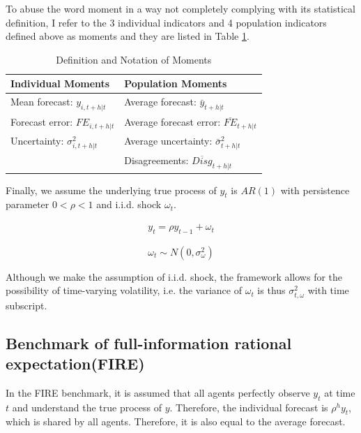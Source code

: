 \documentclass[12pt]{article}
\begin{document}
	To abuse the word moment in a way not completely complying with its statistical definition, I refer to the 3 individual indicators and 4 population indicators defined above as moments and they are  listed in Table \ref{MomSum}.
	
	\begin{table}[p]
		\centering
		\caption{Definition and Notation of Moments}
		\label{MomSum}
		\begin{tabular}{ll}
			
			\hline 
			Individual Moments                                  & Population Moments                             \\
			\hline 
			Mean forecast: $y_{i,t+h|t}$                   & Average forecast: $\bar y_{t+h|t}$                   \\
			Forecast error: $FE_{i,t+h|t}$ & Average forecast error: $\overline{FE}_{t+h|t}$ \\
			Uncertainty: $\sigma^2_{i,t+h|t}$         & Average uncertainty:  $\bar \sigma^2_{t+h|t}$ \\
			& Disagreements:  $\overline{Disg}_{t+h|t}$       \\
			\hline 
		\end{tabular}
	\end{table}
	
	Finally, we assume the underlying true process of $y_{t}$ is $AR(1)$ with persistence parameter $0<\rho <1$ and i.i.d. shock $\omega_t$. 
	
	\begin{eqnarray}\label{AR_process}
		y_{t} = \rho y_{t-1} + \omega_t
	\end{eqnarray}
	
	$$\omega_t \sim N(0,\sigma^2_{\omega})$$
	
	Although we make the assumption of i.i.d. shock, the framework allows for the possibility of time-varying volatility, i.e. the variance of $\omega_t$ is thus $\sigma^2_{t,\omega}$ with time subscript. 
	
	\subsection{Benchmark of full-information rational expectation(FIRE)}
	
	In the FIRE benchmark,  it is assumed that all agents perfectly observe $y_t$ at time $t$ and understand the true process of $y$. Therefore, the individual forecast is $\rho^h y_t $, which is shared by all agents. Therefore, it is also equal to the average forecast. 
	
\end{document}
